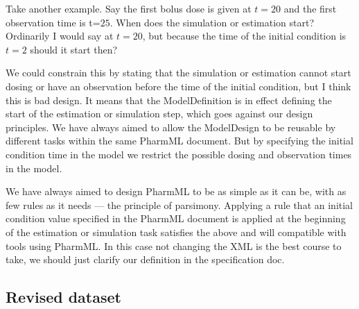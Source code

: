 \documentclass[a4paper,10pt]{article}
\newcommand{\pharmml}{PharmML\xspace}
\begin{document}
Take another example. Say the first bolus dose is given at $t=20$ and
the first observation time is t=$25$. When does the simulation or
estimation start?  Ordinarily I would say at $t=20$, but because the
time of the initial condition is $t=2$ should it start then?

We could constrain this by stating that the simulation or estimation
cannot start dosing or have an observation before the time of the
initial condition, but I think this is bad design. It means that the
ModelDefinition is in effect defining the start of the estimation or
simulation step, which goes against our design principles. We have
always aimed to allow the ModelDesign to be reusable by different
tasks within the same \pharmml document. But by specifying the initial
condition time in the model we restrict the possible dosing and
observation times in the model.

We have always aimed to design \pharmml to be as simple as it can be,
with as few rules as it needs --- the principle of parsimony. Applying
a rule that an initial condition value specified in the \pharmml
document is applied at the beginning of the estimation or simulation
task satisfies the above and will compatible with tools using
\pharmml. In this case not changing the XML is the best course to
take, we should just clarify our definition in the specification doc.

\subsection{Revised dataset}
\label{sec:dataset-refactoring}
\end{document}
